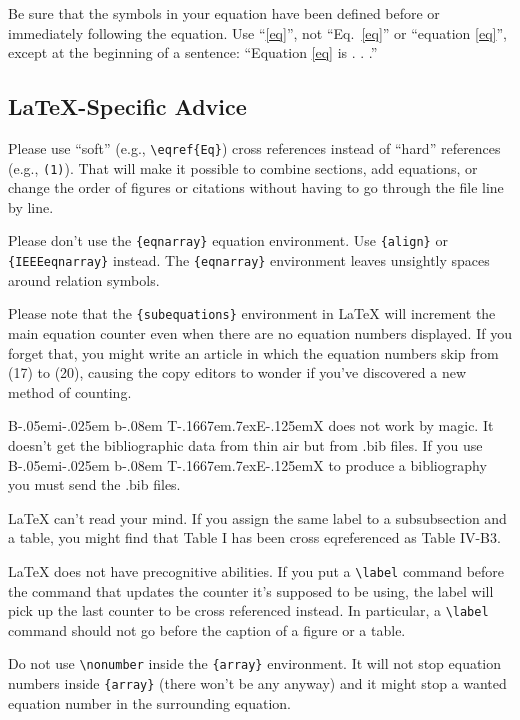 \documentclass[conference]{IEEEtran}
\def\BibTeX{{\rm B\kern-.05em{\sc i\kern-.025em b}\kern-.08em
    T\kern-.1667em\lower.7ex\hbox{E}\kern-.125emX}}
\begin{document}
Be sure that the 
symbols in your equation have been defined before or immediately following 
the equation. Use ``\eqref{eq}'', not ``Eq.~\eqref{eq}'' or ``equation \eqref{eq}'', except at 
the beginning of a sentence: ``Equation \eqref{eq} is . . .''

\subsection{\LaTeX-Specific Advice}

Please use ``soft'' (e.g., \verb|\eqref{Eq}|) cross references instead
of ``hard'' references (e.g., \verb|(1)|). That will make it possible
to combine sections, add equations, or change the order of figures or
citations without having to go through the file line by line.

Please don't use the \verb|{eqnarray}| equation environment. Use
\verb|{align}| or \verb|{IEEEeqnarray}| instead. The \verb|{eqnarray}|
environment leaves unsightly spaces around relation symbols.

Please note that the \verb|{subequations}| environment in {\LaTeX}
will increment the main equation counter even when there are no
equation numbers displayed. If you forget that, you might write an
article in which the equation numbers skip from (17) to (20), causing
the copy editors to wonder if you've discovered a new method of
counting.

{\BibTeX} does not work by magic. It doesn't get the bibliographic
data from thin air but from .bib files. If you use {\BibTeX} to produce a
bibliography you must send the .bib files. 

{\LaTeX} can't read your mind. If you assign the same label to a
subsubsection and a table, you might find that Table I has been cross
eqreferenced as Table IV-B3. 

{\LaTeX} does not have precognitive abilities. If you put a
\verb|\label| command before the command that updates the counter it's
supposed to be using, the label will pick up the last counter to be
cross referenced instead. In particular, a \verb|\label| command
should not go before the caption of a figure or a table.

Do not use \verb|\nonumber| inside the \verb|{array}| environment. It
will not stop equation numbers inside \verb|{array}| (there won't be
any anyway) and it might stop a wanted equation number in the
surrounding equation.
\end{document}
